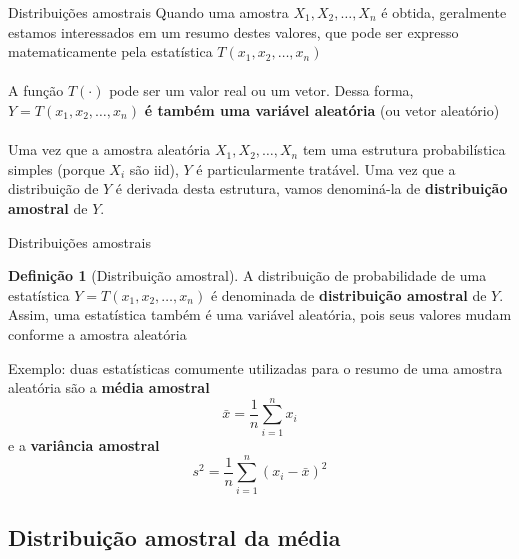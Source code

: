 \documentclass[10pt]{beamer}\usepackage[]{graphicx}\usepackage[]{color}
\theoremstyle{definition}
\newtheorem*{mydef}{Definição}
\begin{document}
\begin{frame}[fragile=singleslide]{Distribuições amostrais}
  Quando uma amostra $X_1, X_2, \ldots, X_n$ é obtida, geralmente
  estamos interessados em um resumo destes valores, que pode ser
  expresso matematicamente pela estatística $T(x_1, x_2, \ldots, x_n)$
  \\~\\
  A função $T(\cdot)$ pode ser um valor real ou um vetor. Dessa forma,
  $Y = T(x_1, x_2, \ldots, x_n)$ \textbf{é também uma variável
    aleatória} (ou vetor aleatório) \\~\\
  Uma vez que a amostra aleatória $X_1, X_2, \ldots, X_n$ tem uma
  estrutura probabilística simples (porque $X_i$ são iid), $Y$ é
  particularmente tratável. Uma vez que a distribuição de $Y$ é derivada
  desta estrutura, vamos denominá-la de \textbf{distribuição amostral}
  de $Y$.
\end{frame}

\begin{frame}[fragile=singleslide]{Distribuições amostrais}
  \begin{mydef}[Distribuição amostral]
    A distribuição de probabilidade de uma estatística $Y = T(x_1, x_2,
    \ldots, x_n)$ é denominada de \textbf{distribuição amostral} de
    $Y$. Assim, uma estatística também é uma variável aleatória, pois
    seus valores mudam conforme a amostra aleatória
  \end{mydef}
    Exemplo: duas estatísticas comumente utilizadas para o resumo de uma
    amostra aleatória são a \textbf{média amostral}
\begin{equation*}
  \bar{x} = \frac{1}{n} \sum_{i=1}^{n} x_i
\end{equation*}
e a \textbf{variância amostral}
\begin{equation*}
  s^2 = \frac{1}{n} \sum_{i=1}^{n} (x_i - \bar{x})^2
\end{equation*}
\end{frame}

\subsection{Distribuição amostral da média}
\end{document}
